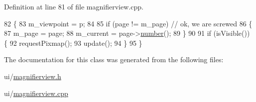 Definition at line 81 of file magnifierview.\+cpp.


\begin{DoxyCode}
82 \{
83   m\_viewpoint = p;
84 
85   \textcolor{keywordflow}{if} (page != m\_page) \textcolor{comment}{// ok, we are screwed}
86   \{
87     m\_page = page;
88     m\_current = page->\hyperlink{classOkular_1_1Page_a6eee5f157a130b47d81ddd63e501664b}{number}();
89   \}
90 
91   \textcolor{keywordflow}{if} (isVisible()) \{
92     requestPixmap();
93     update();
94   \}
95 \}
\end{DoxyCode}


The documentation for this class was generated from the following files\+:\begin{DoxyCompactItemize}
\item 
ui/\hyperlink{magnifierview_8h}{magnifierview.\+h}\item 
ui/\hyperlink{magnifierview_8cpp}{magnifierview.\+cpp}\end{DoxyCompactItemize}
